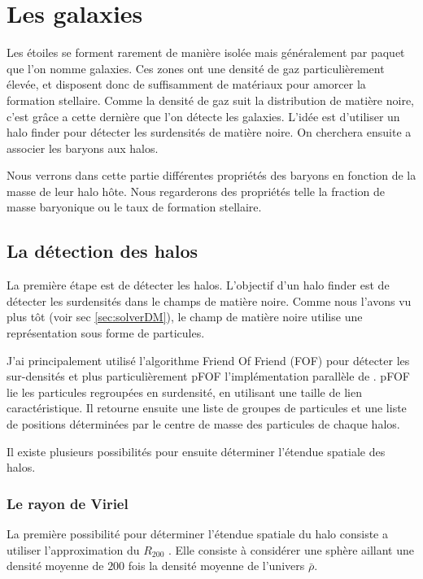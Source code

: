 \chapter{Les galaxies}

Les étoiles se forment rarement de manière isolée mais généralement par paquet que l'on nomme galaxies.
Ces zones ont une densité de gaz particulièrement élevée, et disposent donc de suffisamment de matériaux pour amorcer la formation stellaire.
Comme la densité de gaz suit la distribution de matière noire, c'est grâce a cette dernière que l'on détecte les galaxies.
L'idée est d'utiliser un halo finder pour détecter les surdensités de matière noire.
On cherchera ensuite a associer les baryons aux halos.

Nous verrons dans cette partie différentes propriétés des baryons en fonction de la masse de leur halo hôte.
Nous regarderons des propriétés telle la fraction de masse baryonique ou le taux de formation stellaire.


\section{La détection des halos}
La première étape est de détecter les halos.
L'objectif d'un halo finder est de détecter les surdensités dans le champs de matière noire.
Comme nous l'avons vu plus tôt (voir sec \ref{sec:solverDM}), le champ de matière noire utilise une représentation sous forme de particules.

J'ai principalement utilisé l’algorithme Friend Of Friend (FOF) pour détecter les sur-densités et plus particulièrement pFOF l'implémentation parallèle de \cite{2014A&A...564A..13R}.
pFOF lie les particules regroupées en surdensité, en utilisant une taille de lien caractéristique.
Il retourne ensuite une liste de groupes de particules et une liste de positions déterminées par le centre de masse des particules de chaque halos.

Il existe plusieurs possibilités pour ensuite déterminer l'étendue spatiale des halos.

\subsection{Le rayon de Viriel}
La première possibilité pour déterminer l'étendue spatiale du halo consiste a utiliser l'approximation du $R_{200}$ \citep{1997ApJ...490..493N}.
Elle consiste à considérer une sphère aillant une densité moyenne de $200$ fois la densité moyenne de l'univers $\bar{\rho}$.

